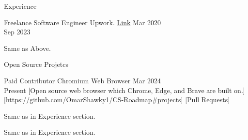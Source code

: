 \documentclass{resume} %
\begin{document}
\begin{rSection}{Experience}
    \begin{rOSubsection}
        {Freelance Software Engineer}
        {Upwork. \href{https://github.com/}{Link}} %
        {Mar 2020 \\ Sep 2023}
        \begin{rItemize}
            \item Same as Above.
        \end{rItemize}
    \end{rOSubsection}
\end{rSection}


\begin{rSection}{Open Source Projetcs}
    \begin{rOSubsection}
        {Paid Contributor}
        {Chromium Web Browser}
        {Mar 2024 \\ Present}
        [Open source web browser which Chrome, Edge, and Brave are built on.]
        [https://github.com/OmarShawky1/CS-Roadmap#projects]
        [Pull Requests]
        \begin{rItemize}
            \begin{rItemize}
                \item Same as in Experience section.
            \end{rItemize}
            \item Same as in Experience section.
        \end{rItemize}
    \end{rOSubsection}
\end{rSection}

\end{document}
